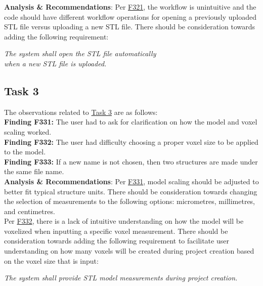 \documentclass{article}
\begin{document}
\noindent \textbf{Analysis \& Recommendations}:
Per \hyperlink{finding:F321}{F321}, the workflow is unintuitive and the code should have different workflow operations for opening a previously uploaded STL file versus uploading a new STL file. There should be consideration towards adding the following requirement:

\begin{center}
  \textit{The system shall open the STL file automatically }\\
  \textit{when a new STL file is uploaded.}
\end{center}

\subsection{Task 3}

\noindent The observations related to \hyperlink{task:T3}{Task 3} are as follows:\\

\noindent \hypertarget{finding:F331}{\textbf{Finding F331:}} 
The user had to ask for clarification on how the model and voxel scaling worked.  \\ 

\noindent \hypertarget{finding:F332}{\textbf{Finding F332:}} 
The user had difficulty choosing a proper voxel size to be applied to the model. \\ 

\noindent \hypertarget{finding:F333}{\textbf{Finding F333:}} 
If a new name is not chosen, then two structures are made under the same file name. \\ 


\noindent \textbf{Analysis \& Recommendations}:
Per \hyperlink{finding:F331}{F331}, model scaling should be adjusted to better fit typical structure units. There should be consideration towards changing the selection of measurements to the following options: micrometres, millimetres, and centimetres.\\

\noindent Per \hyperlink{finding:F332}{F332}, there is a lack of intuitive understanding on how the model will be voxelized when inputting a specific voxel measurement. There should be consideration towards adding the following requirement to facilitate user understanding on how many voxels will be created during project creation based on the voxel size that is input:

\begin{center}
  \textit{The system shall provide STL model measurements during project creation.}\\
\end{center}
\end{document}
